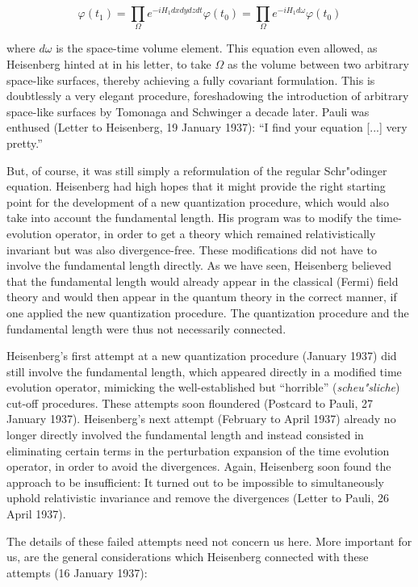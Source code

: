 \documentclass[12pt,a4paper]{article}
\begin{document}
\begin{equation}
\varphi(t_1) = \prod_{\Omega} e^{-i H_1 dx dy dz dt} \varphi(t_0) = \prod_{\Omega} e^{-i H_1 d\omega} \varphi(t_0)
\end{equation}

where $d\omega$ is the space-time volume element. This equation even allowed, as Heisenberg hinted at in his letter, to take $\Omega$ as the volume between two arbitrary space-like surfaces, thereby achieving a fully covariant formulation. This is doubtlessly a very elegant procedure, foreshadowing the introduction of arbitrary space-like surfaces by Tomonaga and Schwinger a decade later. Pauli was enthused (Letter to Heisenberg, 19 January 1937): ``I find your equation [...] very pretty.''

But, of course, it was still simply a reformulation of the regular Schr"odinger equation. Heisenberg had high hopes that it might provide the right starting point for the development of a new quantization procedure, which would also take into account the fundamental length. His program was to modify the time-evolution operator, in order to get a theory which remained relativistically invariant but was also divergence-free. These modifications did not have to involve the fundamental length directly. As we have seen, Heisenberg believed that the fundamental length would already appear in the classical (Fermi) field theory and would then appear in the quantum theory in the correct manner, if one applied the new quantization procedure.  The quantization procedure and the fundamental length were thus not necessarily connected.

Heisenberg's first attempt at a new quantization procedure (January 1937) did still involve the fundamental length, which appeared directly in a modified time evolution operator,  mimicking the well-established but ``horrible'' (\emph{scheu"sliche}) cut-off procedures. These attempts soon floundered (Postcard to Pauli, 27 January 1937). Heisenberg's next attempt (February to April 1937) already no longer directly involved the fundamental length and instead consisted in eliminating certain terms in the perturbation expansion of the time evolution operator, in order to avoid the divergences. Again, Heisenberg soon found the approach to be insufficient: It turned out to be impossible to simultaneously uphold relativistic invariance and remove the divergences (Letter to Pauli, 26 April 1937). 

The details of these failed attempts need not concern us here. More important for us, are the general considerations which Heisenberg connected with these attempts (16 January 1937):
\end{document}
